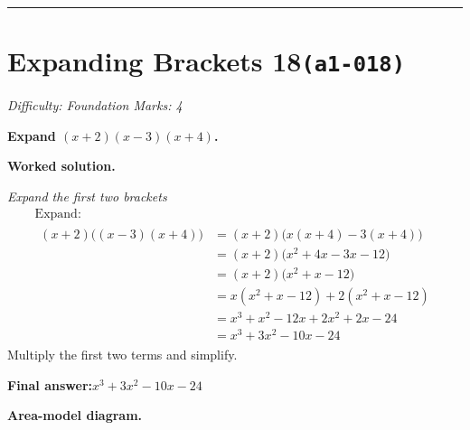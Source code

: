 \documentclass[11pt]{article}
\newcommand{\question}[1]{\par\medskip\noindent\textbf{#1}\par}
\begin{document}
\medskip\hrule

\section*{Expanding Brackets 18\quad\small\texttt{(a1-018)}}
\textit{Difficulty: Foundation \quad\textbar\quad Marks: 4}

\question{Expand \( (x+2)(x-3)(x+4) \).}

\textbf{Worked solution.}

\textit{Expand the first two brackets}
\[\begin{gathered}
\text{Expand:} \\[1em] \begin{aligned} (x+2)\Big( (x-3)(x+4)\Big) & = (x+2)\Big(x(x+4)-3(x+4)) \\ &= (x+2)\Big(x^2+4x-3x-12\Big) \\ &= (x+2)\Big(x^2+x-12\Big) \\ &= x(x^2+x-12)+2(x^2+x-12) \\ &= x^3+x^2-12x+2x^2+2x-24 \\ &= x^3+3x^2-10x-24 \end{aligned}
\end{gathered}\]
Multiply the first two terms and simplify.

\begin{answerbox}
\textbf{Final answer:}\quad \(\displaystyle x^3 + 3x^2 - 10x - 24\)
\end{answerbox}
\textbf{Area-model diagram.}
\end{document}
